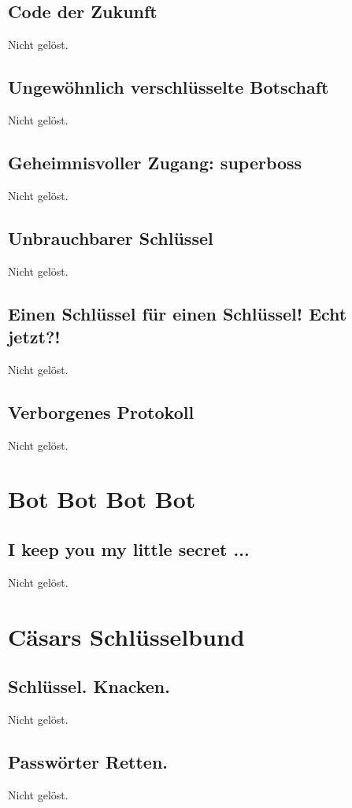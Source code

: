 \documentclass[12pt,a4paper,titlepage,oneside]{scrartcl}
\begin{document}
\subsection{Code der Zukunft}
Nicht gelöst.

\subsection{Ungew\"ohnlich verschl\"usselte Botschaft}
Nicht gelöst.

\subsection{Geheimnisvoller Zugang: superboss}
Nicht gelöst.

\subsection{Unbrauchbarer Schl\"ussel}
Nicht gelöst.

\subsection{Einen Schl\"ussel f\"ur einen Schl\"ussel! Echt jetzt?!}
Nicht gelöst.

\subsection{Verborgenes Protokoll}
Nicht gelöst.


\section{Bot Bot Bot Bot}

\subsection{I keep you my little secret ...}
Nicht gelöst.


\section{C\"asars Schl\"usselbund}

\subsection{Schl\"ussel. Knacken.}
Nicht gelöst.

\subsection{Passw\"orter Retten.}
Nicht gelöst.
\end{document}
